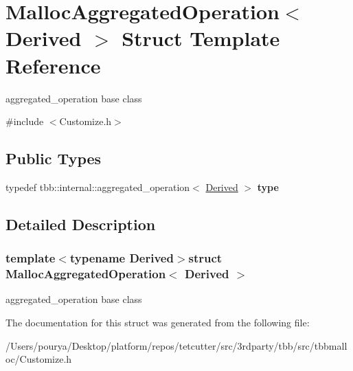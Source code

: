 \hypertarget{structMallocAggregatedOperation}{}\section{Malloc\+Aggregated\+Operation$<$ Derived $>$ Struct Template Reference}
\label{structMallocAggregatedOperation}


aggregated\+\_\+operation base class  




{\ttfamily \#include $<$Customize.\+h$>$}

\subsection*{Public Types}
\begin{DoxyCompactItemize}
\item 
\hypertarget{structMallocAggregatedOperation_a3ea35a25eff897868133a1abfd132334}{}typedef tbb\+::internal\+::aggregated\+\_\+operation$<$ \hyperlink{classDerived}{Derived} $>$ {\bfseries type}\label{structMallocAggregatedOperation_a3ea35a25eff897868133a1abfd132334}

\end{DoxyCompactItemize}


\subsection{Detailed Description}
\subsubsection*{template$<$typename Derived$>$struct Malloc\+Aggregated\+Operation$<$ Derived $>$}

aggregated\+\_\+operation base class 

The documentation for this struct was generated from the following file\+:\begin{DoxyCompactItemize}
\item 
/\+Users/pourya/\+Desktop/platform/repos/tetcutter/src/3rdparty/tbb/src/tbbmalloc/Customize.\+h\end{DoxyCompactItemize}
